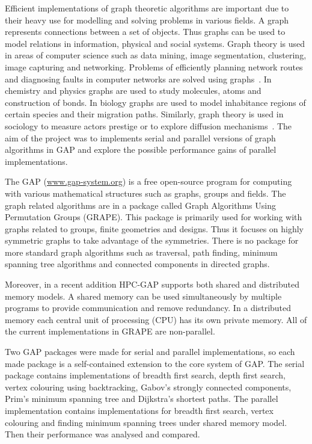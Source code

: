 \documentclass{report}
\theoremstyle{plain}
\theoremstyle{definition}
\theoremstyle{remark}
\begin{document}
Efficient implementations of graph theoretic algorithms are important due to their heavy use for modelling and solving problems in various fields. A graph represents connections between a set of objects. Thus graphs can be used to model relations in information, physical and social systems. Graph theory is used in areas of computer science such as data mining, image segmentation, clustering, image capturing and networking. Problems of efficiently planning network routes and diagnosing faults in computer networks are solved using graphs~\cite{6005872}. In chemistry and physics graphs are used to study molecules, atoms and construction of bonds. In biology graphs are used to model inhabitance regions of certain species and their migration paths. Similarly, graph theory is used in sociology to measure actors prestige or to explore diffusion mechanisms~\cite{shirinivas2010applications}. The aim of the project was to implements serial and parallel versions of graph algorithms in GAP and explore the possible performance gains of parallel implementations.

The GAP (\url{www.gap-system.org}) is a free open-source program for computing with various mathematical structures such as graphs, groups and fields. The graph related algorithms are in a package called Graph Algorithms Using Permutation Groups (GRAPE). This package is primarily used for working with graphs related to groups, finite geometries and designs. Thus it focuses on highly symmetric graphs to take advantage of the symmetries. There is no package for more standard graph algorithms such as traversal, path finding, minimum spanning tree algorithms and connected components in directed graphs.

Moreover, in a recent addition HPC-GAP supports both shared and distributed memory models. A shared memory can be used simultaneously by multiple programs to provide communication and remove redundancy. In a distributed memory each central unit of processing (CPU) has its own private memory. All of the current implementations in GRAPE are non-parallel.

Two GAP packages were made for serial and parallel implementations, so each made package is a self-contained extension to the core system of GAP. The serial package contains implementations of breadth first search, depth first search, vertex colouring using backtracking, Gabov's strongly connected components, Prim's minimum spanning tree and Dijkstra's shortest paths. The parallel implementation contains implementations for breadth first search, vertex colouring and finding minimum spanning trees under shared memory model. Then their performance was analysed and compared.
\end{document}
